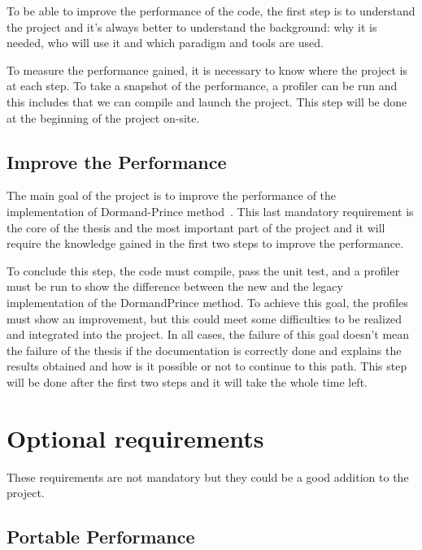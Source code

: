 To be able to improve the performance of the code, the first step is to understand the project and it's always better to understand the background: why it is needed, who will use it and which paradigm and tools are used.

To measure the performance gained, it is necessary to know where the project is at each step.
To take a snapshot of the performance, a profiler can be run and this includes that we can compile and launch the project.
This step will be done at the beginning of the project on-site.


\subsection{Improve the Performance}
\label{spec:ch:goals:mandatory-requirements:improve-the-performance}

The main goal of the project is to improve the performance of the implementation of Dormand-Prince method~\cite{princeDormand}.
This last mandatory requirement is the core of the thesis and the most important part of the project and it will require the knowledge gained in the first two steps to improve the performance.

To conclude this step, the code must compile, pass the unit test, and a profiler must be run to show the difference between the new and the legacy implementation of the DormandPrince method.
To achieve this goal, the profiles must show an improvement, but this could meet some difficulties to be realized and integrated into the project.
In all cases, the failure of this goal doesn't mean the failure of the thesis if the documentation is correctly done and explains the results obtained and how is it possible or not to continue to this path.
This step will be done after the first two steps and it will take the whole time left.


\section{Optional requirements}
\label{spec:ch:goals:optional-requirements}

These requirements are not mandatory but they could be a good addition to the project.

\subsection{Portable Performance}
\label{spec:ch:goals:optional-requirements:general-optimization}

